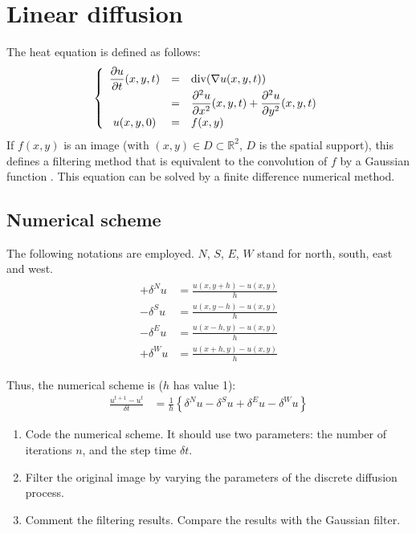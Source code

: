\section{Linear diffusion}
The heat equation is defined as follows:
\begin{eqnarray}
\left\{\begin{array}{ccl}
\displaystyle\frac{\partial u}{\partial t}(x,y,t)&=&\operatorname*{div} (\nabla u(x,y,t))\\
&=&\displaystyle\frac{\partial^2 u}{\partial x^2}(x,y,t)+\displaystyle\frac{\partial^2 u}{\partial y^2}(x,y,t)\\
u(x,y,0)&=&f(x,y)
\end{array}
\right.
\end{eqnarray}
If $f(x,y)$ is an image (with $(x,y)\in D\subset\mathbb{R}^2$, $D$ is the spatial support), this defines a filtering method that is equivalent to the convolution of $f$ by a Gaussian function \cite{Koenderink1984}.
This equation can be solved by a finite difference numerical method.

\subsection{Numerical scheme}
The following notations are employed. $N$, $S$, $E$, $W$ stand for north, south, east and west.
\begin{eqnarray}
\begin{array}{ll}
 +\delta^N u &= \frac{u(x,y+h)-u(x,y)}{h} \\
 -\delta^S u &= \frac{u(x,y-h)-u(x,y)}{h} \\
 -\delta^E u &= \frac{u(x-h,y)-u(x,y)}{h} \\
 +\delta^W u &= \frac{u(x+h,y)-u(x,y)}{h}  
 \end{array}
\end{eqnarray}

Thus, the numerical scheme is ($h$ has value 1):
\begin{align}
 \frac{u^{t+1}-u^t}{\delta t} &= \frac{1}{h}\left\{\delta^N u - \delta^S u + \delta^E u - \delta^W u\right\}
\end{align}

\begin{qbox}
\begin{enumerate}
	\item Code the numerical scheme. It should use two parameters: the number of iterations $n$, and the step time $\delta t$.
	\item Filter the original image by varying the parameters of the discrete diffusion process.
	\item Comment the filtering results. Compare the results with the Gaussian filter.
\end{enumerate}
\end{qbox}


